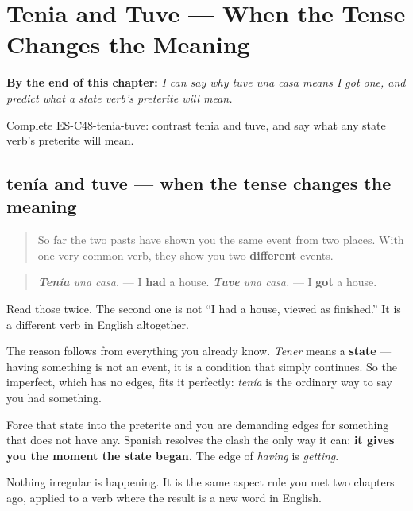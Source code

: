 
\chapter{Tenia and Tuve --- When the Tense Changes the Meaning}
\label{ch:aspect-changes-meaning}

\begin{chapteropening}
\textbf{By the end of this chapter:} \emph{I can say why tuve una casa means I got one, and predict what a state verb's preterite will mean.}

Complete ES-C48-tenia-tuve: contrast tenia and tuve, and say what any state verb's preterite will mean.
\end{chapteropening}

\section[tenía / tuve]{tenía and tuve — when the tense changes the meaning}

\label{lesson:ES-C48-tenia-tuve}



\begin{quote}
So far the two pasts have shown you the same event from two places. With one very common verb, they show you two \textbf{different} events.
\end{quote}

\begin{grammarlens}[title={Grammar Lens: having, and getting}]
\begin{quote}
\emph{\textbf{Tenía} una casa.} — I \textbf{had} a house. \emph{\textbf{Tuve} una casa.} — I \textbf{got} a house.
\end{quote}

Read those twice. The second one is not \textquotedblleft{}I had a house, viewed as finished.\textquotedblright{} It is a different verb in English altogether.

The reason follows from everything you already know. \emph{Tener} means a \textbf{state} — having something is not an event, it is a condition that simply continues. So the imperfect, which has no edges, fits it perfectly: \emph{tenía} is the ordinary way to say you had something.

Force that state into the preterite and you are demanding edges for something that does not have any. Spanish resolves the clash the only way it can: \textbf{it gives you the moment the state began.} The edge of \emph{having} is \emph{getting}.

Nothing irregular is happening. It is the same aspect rule you met two chapters ago, applied to a verb where the result is a new word in English.
\end{grammarlens}


